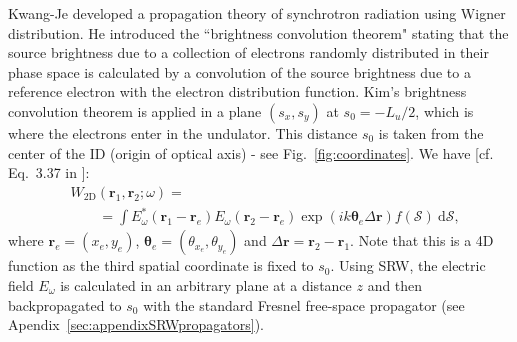 \documentclass{iucr}              %
\begin{document}
Kwang-Je  developed a propagation theory of synchrotron radiation using Wigner distribution. He introduced the ``brightness convolution theorem" stating that the source brightness due to a collection of electrons randomly distributed in their phase space is calculated by a convolution of the source brightness due to a reference electron with the electron distribution function. 
Kim's brightness convolution theorem is applied in a plane $(s_x,s_y)$ at $s_0=-L_u\big/2$, which is where the  electrons enter in the undulator. This distance $s_0$ is taken from the center of the ID (origin of optical axis) - see Fig.~\ref{fig:coordinates}. We have [cf. Eq.~3.37 in \cite{glassThesis}]:
\begin{equation}\label{eq:comsyl_W2D}
\begin{split}
& W_\text{2D}(\textbf{r}_1,\textbf{r}_2;\omega) = \\
&\qquad=\int E_\omega^*(\textbf{r}_1-\textbf{r}_e)
    E_\omega(\textbf{r}_2-\textbf{r}_e) \exp(i k \mathbf{\theta}_e\Delta\textbf{r})f(\mathcal{S})~\text{d}\mathcal{S},
\end{split}
\end{equation}
where $\textbf{r}_e=(x_e,y_e)$, $\mathbf{\theta}_e=(\theta_{x_e},\theta_{y_e})$ and $\Delta\textbf{r}=\textbf{r}_2-\textbf{r}_1$. Note that this is a 4D function as the third spatial coordinate is fixed to $s_0$. Using SRW, the electric field $E_\omega$ is calculated in an arbitrary plane at a distance $z$ and then backpropagated to $s_0$ with the standard Fresnel free-space propagator (see Apendix~\ref{sec:appendixSRWpropagators}).


\end{document}
